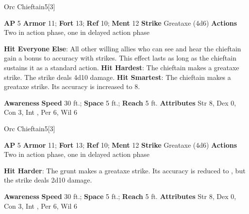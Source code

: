 \begin{monsection}{Orc Chieftain}{5}[3]
\vspace{-1em}\vspace{-1em}
\begin{spellcontent}
\begin{spelltargetinginfo}
{\textbf{AP} 5}
\pari \textbf{Armor} 11;
\textbf{Fort} 13;
\textbf{Ref} 10;
\textbf{Ment} 12
\pari \textbf{Strike} Greataxe  (4d6)
\pari \textbf{Actions} Two in action phase, one in delayed action phase
\end{spelltargetinginfo}
\begin{spelleffects}
\pari
\textbf{Hit Everyone Else}:
All other willing allies who can see and hear the chieftain gain a  bonus to accuracy with strikes.
This effect lasts as long as the chieftain sustains it as a standard action.
\vspace{0.5em}
\pari
\textbf{Hit Hardest}:
The chieftain makes a greataxe strike.
The strike deals 4d10 damage.
\vspace{0.5em}
\pari
\textbf{Hit Smartest}:
The chieftain makes a greataxe strike.
Its accuracy is increased to 8.
\end{spelleffects}
\end{spellcontent}
\begin{spellsubcontent}
\begin{spellfooter}
\pari \textbf{Awareness} 
\pari \textbf{Speed} 30 ft.;
\textbf{Space} 5 ft.;
\textbf{Reach} 5 ft.
\pari \textbf{Attributes}
Str 8,
Dex 0,
Con 3,
Int ,
Per 6,
Wil 6
\end{spellfooter}
\end{spellsubcontent}
\end{monsection}
\begin{monsection}{Orc Chieftain}{5}[3]
\vspace{-1em}\vspace{-1em}
\begin{spellcontent}
\begin{spelltargetinginfo}
{\textbf{AP} 5}
\pari \textbf{Armor} 11;
\textbf{Fort} 13;
\textbf{Ref} 10;
\textbf{Ment} 12
\pari \textbf{Strike} Greataxe  (4d6)
\pari \textbf{Actions} Two in action phase, one in delayed action phase
\end{spelltargetinginfo}
\begin{spelleffects}
\pari
\textbf{Hit Harder}:
The grunt makes a greataxe strike.
Its accuracy is reduced to , but the strike deals 2d10 damage.
\end{spelleffects}
\end{spellcontent}
\begin{spellsubcontent}
\begin{spellfooter}
\pari \textbf{Awareness} 
\pari \textbf{Speed} 30 ft.;
\textbf{Space} 5 ft.;
\textbf{Reach} 5 ft.
\pari \textbf{Attributes}
Str 8,
Dex 0,
Con 3,
Int ,
Per 6,
Wil 6
\end{spellfooter}
\end{spellsubcontent}
\end{monsection}
